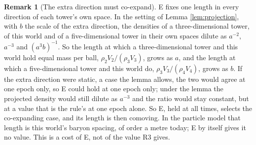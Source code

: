 \documentclass[11pt]{article}
\theoremstyle{definition}
\newtheorem{remark}[theorem]{Remark}
\begin{document}
\begin{remark}[The extra direction must co-expand]\label{rem:coexpand}
E fixes one length in every direction of each tower's own space. In the setting of Lemma \ref{lem:projection}, with $b$ the scale of the extra direction, the densities of a three-dimensional tower, of this world and of a five-dimensional tower in their own spaces dilute as $a^{-2}$, $a^{-3}$ and $(a^{3}b)^{-1}$. So the length at which a three-dimensional tower and this world hold equal mass per ball, $\rho_{2}V_{2}/(\rho_{3}V_{3})$, grows as $a$, and the length at which a five-dimensional tower and this world do, $\rho_{3}V_{3}/(\rho_{4}V_{4})$, grows as $b$. If the extra direction were static, a case the lemma allows, the two would agree at one epoch only, so E could hold at one epoch only; under the lemma the projected density would still dilute as $a^{-3}$ and the ratio would stay constant, but at a value that is the rule's at one epoch alone. So E, held at all times, selects the co-expanding case, and its length is then comoving. In the particle model that length is this world's baryon spacing, of order a metre today; E by itself gives it no value. This is a cost of E, not of the value R3 gives.
\end{remark}
\end{document}
